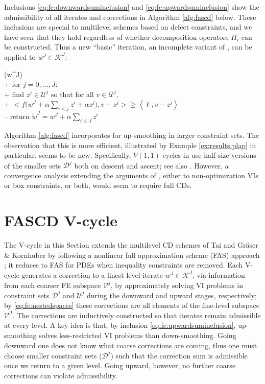 \documentclass[review,hidelinks,onefignum,onetabnum]{siamart220329}
\newcommand{\ip}[2]{\left<#1,#2\right>}
\begin{document}
Inclusions \eqref{eq:fe:downwardsuminclusion} and \eqref{eq:fe:upwardsuminclusion} show the admissibility of all iterates and corrections in Algorithm \ref{alg:fascd} below.  These inclusions are special to multilevel schemes based on defect constraints, and we have seen that they hold regardless of whether decomposition operators $\Pi_i$ can be constructed.  Thus a new ``basic'' iteration, an incomplete variant of , can be applied to $w^J\in\mathcal{K}^J$:

\begin{pseudo*}
(w^J)\text{:} \\+
    for $j = 0,\dots,J$: \\+
        \rm{find} $z^j\in \mathcal{U}^j$ \rm{so that for all} $v \in \mathcal{U}^j$, \\+
            $\displaystyle \Big<f\Big(w^J + \alpha \sum_{i<j} z^i + \alpha z^j\Big),v-z^j\Big> \ge \ip{\ell}{v-z^j}$ \\--
    return $\tilde w^J=w^J + \alpha \sum_{i\le J} z^i$
\end{pseudo*}

Algorithm \ref{alg:fascd} incorporates  for up-smoothing in larger constraint sets.  The observation that this is more efficient, illustrated by Example \ref{ex:results:plap} in particular, seems to be new.  Specifically, $V(1,1)$ cycles in \cite{GraeserKornhuber2009} use half-size versions of the smaller sets $\mathcal{D}^j$ both on descent and ascent; see also \cite[section 5.4]{Tai2003}.  However, a convergence analysis extending the arguments of \cite{GraeserKornhuber2009,Tai2003}, either to non-optimization VIs or box constraints, or both, would seem to require full CDs.


\section{FASCD V-cycle} \label{sec:vcycle}

The V-cycle in this Section extends the multilevel CD schemes of Tai \cite{Tai2003} and Gr\"aser \& Kornhuber \cite[Algorithm 4.2]{GraeserKornhuber2009} by following a nonlinear full approximation scheme (FAS) approach \cite{BrandtLivne2011}; it reduces to FAS for PDEs when inequality constraints are removed.  Each V-cycle generates a correction to a finest-level iterate $w^J \in \mathcal{K}^J$, via information from each coarser FE subspace $\mathcal{V}^j$, by approximately solving VI problems in constraint sets $\mathcal{D}^j$ and $\mathcal{U}^j$ during the downward and upward stages, respectively; by \eqref{eq:fe:nestedspaces} these corrections are all elements of the fine-level subspace $\mathcal{V}^J$.  The corrections are inductively constructed so that iterates remain admissible at every level.  A key idea is that, by inclusion \eqref{eq:fe:upwardsuminclusion}, up-smoothing solves less-restricted VI problems than down-smoothing.  Going downward one does not know what coarse corrections are coming, thus one must choose smaller constraint sets ($\mathcal{D}^j$) such that the correction sum is admissible once we return to a given level.  Going upward, however, no further coarse corrections can violate admissibility.
\end{document}
